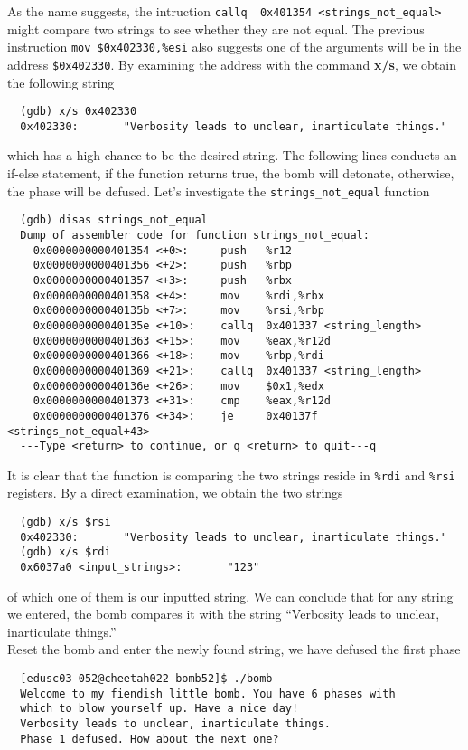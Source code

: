 As the name suggests, the intruction \verb+callq  0x401354 <strings_not_equal>+ might compare two strings to see whether they are not equal. The previous instruction \verb+mov $0x402330,%esi+ also suggests one of the arguments will be in the address \verb+$0x402330+. By examining the address with the command \textbf{x/s}, we obtain the following string
\begin{verbatim}
  (gdb) x/s 0x402330
  0x402330:       "Verbosity leads to unclear, inarticulate things."
\end{verbatim}
which has a high chance to be the desired string. The following lines conducts an if-else statement, if the function returns true, the bomb will detonate, otherwise, the phase will be defused. Let's investigate the \verb+strings_not_equal+ function
\begin{verbatim}
  (gdb) disas strings_not_equal
  Dump of assembler code for function strings_not_equal:
    0x0000000000401354 <+0>:     push   %r12
    0x0000000000401356 <+2>:     push   %rbp
    0x0000000000401357 <+3>:     push   %rbx
    0x0000000000401358 <+4>:     mov    %rdi,%rbx
    0x000000000040135b <+7>:     mov    %rsi,%rbp
    0x000000000040135e <+10>:    callq  0x401337 <string_length>
    0x0000000000401363 <+15>:    mov    %eax,%r12d
    0x0000000000401366 <+18>:    mov    %rbp,%rdi
    0x0000000000401369 <+21>:    callq  0x401337 <string_length>
    0x000000000040136e <+26>:    mov    $0x1,%edx
    0x0000000000401373 <+31>:    cmp    %eax,%r12d
    0x0000000000401376 <+34>:    je     0x40137f <strings_not_equal+43>
  ---Type <return> to continue, or q <return> to quit---q
\end{verbatim}
It is clear that the function is comparing the two strings reside in \verb+%rdi+ and \verb+%rsi+ registers. By a direct examination, we obtain the two strings
\begin{verbatim}
  (gdb) x/s $rsi
  0x402330:       "Verbosity leads to unclear, inarticulate things."
  (gdb) x/s $rdi
  0x6037a0 <input_strings>:       "123"
\end{verbatim}
of which one of them is our inputted string. We can conclude that for any string we entered, the bomb compares it with the string ``Verbosity leads to unclear, inarticulate things.''\\
Reset the bomb and enter the newly found string, we have defused the first phase
\begin{verbatim}
  [edusc03-052@cheetah022 bomb52]$ ./bomb
  Welcome to my fiendish little bomb. You have 6 phases with
  which to blow yourself up. Have a nice day!
  Verbosity leads to unclear, inarticulate things.
  Phase 1 defused. How about the next one?
\end{verbatim}

\newpage